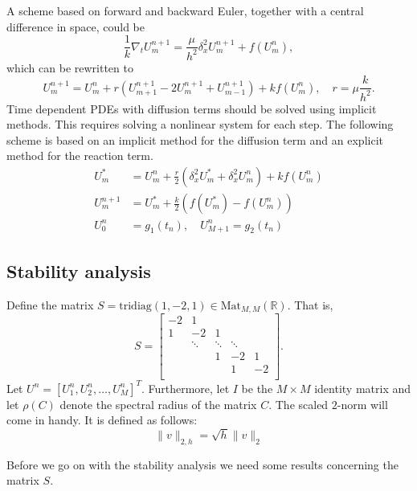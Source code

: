 A scheme based on forward and backward Euler,
together with a central difference in space, could be
$$
  \frac{1}{k}\nabla_tU_{m}^{n+1}=\frac{\mu}{h^2}\delta_x^2U_{m}^{n+1}+f(U_{m}^{n} ),
$$
which can be rewritten to 
\begin{equation}
  \label{eq:scheme}
  U_{m}^{n+1} = U_{m}^{n} + r (U_{m+1}^{n+1}-2U_{m}^{n+1}+U_{m-1}^{n+1}) + kf(U_{m}^{n}), \quad r = \mu\frac{k}{h^2}.
\end{equation}
Time dependent PDEs with diffusion terms should be solved using implicit methods.
This requires solving a nonlinear system for each step.
The following scheme is based on an implicit method
for the diffusion term and an explicit method for the reaction term.
\begin{align}
  \label{eq:scheme_implicit_eq}
  U_{m}^{*} &= U_{m}^{n} +\frac{r}{2}(\delta_x^2 U_{m}^{*} + \delta_x^2 U_{m}^{n} ) + kf(U_{m}^{n}) \\
  \label{eq:scheme_explicit_eq}
    U_{m}^{n+1} &= U_{m}^{*} + \frac{k}{2}(f(U_{m}^{*}) - f(U_{m}^{n})) \\
  \label{eq:scheme_boundary}
    U_0^n &= g_1(t_n), \quad U_{M+1}^n = g_2(t_n)
\end{align}

\subsection{Stability analysis}

Define the matrix \( S = \text{tridiag}(1, -2, 1) \in \text{Mat}_{M,M}(\mathbb{R}) \).
That is,
\begin{equation}
  \label{eq:Smatrix}
  S = 
  \begin{bmatrix}
    -2 & 1 &  &  & \\
    1& -2 & 1 &  & \\
     & \ddots & \ddots & \ddots & \\
     &  & 1 & -2 & 1\\
     &  &  & 1 & -2\\
  \end{bmatrix}.
\end{equation}
Let \( U^n = [U_1^n, U_2^n, \dots, U_M^n]^T \).
Furthermore, let \( I \) be the \( M \times M \) identity matrix and
let \( \rho(C) \) denote the spectral radius of the matrix \( C \).
The scaled \( 2 \)-norm will come in handy.
It is defined as follows:
\[
  \lVert v \rVert_{2,h} = \sqrt{h}\lVert v \rVert_2
\]

Before we go on with the stability analysis we need some results
concerning the matrix \( S \).

